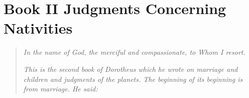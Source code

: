 \chapter{Book II Judgments Concerning Nativities}
\begin{quote}
\textsl{In the name of God, the merciful and compassionate, to Whom I resort.}

\textsl{This is the second book of Dorotheus which he wrote on marriage and children and judgments of the planets. The beginning of its beginning is from marriage. He said:}
\end{quote}





